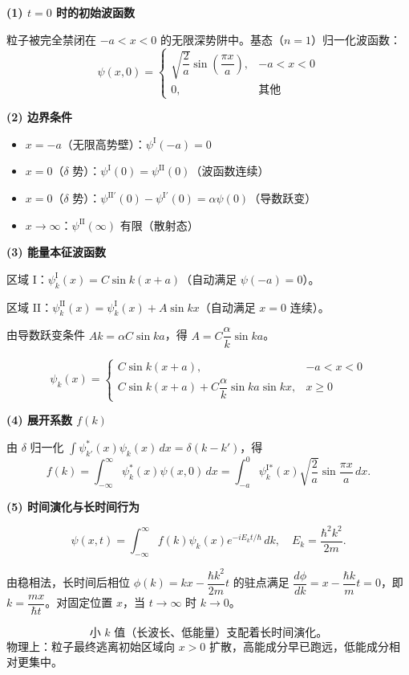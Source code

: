 \begin{derivationbox}[标准解题过程]
\textbf{(1) $t=0$ 时的初始波函数}

粒子被完全禁闭在 $-a<x<0$ 的无限深势阱中。基态（$n=1$）归一化波函数：
\begin{equation}
\boxed{\psi(x,0)=\begin{cases}\sqrt{\dfrac{2}{a}}\sin\left(\dfrac{\pi x}{a}\right),&-a<x<0\\0,&\text{其他}\end{cases}}
\end{equation}

\textbf{(2) 边界条件}

\begin{itemize}
    \item $x=-a$（无限高势壁）：$\psi^{\text{I}}(-a)=0$
    \item $x=0$（$\delta$ 势）：$\psi^{\text{I}}(0)=\psi^{\text{II}}(0)$（波函数连续）
    \item $x=0$（$\delta$ 势）：$\psi^{\text{II}'}(0)-\psi^{\text{I}'}(0)=\alpha\psi(0)$（导数跃变）
    \item $x\to\infty$：$\psi^{\text{II}}(\infty)$ 有限（散射态）
\end{itemize}

\textbf{(3) 能量本征波函数}

区域 I：$\psi_k^{\text{I}}(x)=C\sin k(x+a)$（自动满足 $\psi(-a)=0$）。

区域 II：$\psi_k^{\text{II}}(x)=\psi_k^{\text{I}}(x)+A\sin kx$（自动满足 $x=0$ 连续）。

由导数跃变条件 $Ak=\alpha C\sin ka$，得 $A=C\dfrac{\alpha}{k}\sin ka$。

\begin{equation}
\boxed{\psi_k(x)=\begin{cases}C\sin k(x+a),&-a<x<0\\C\sin k(x+a)+C\dfrac{\alpha}{k}\sin ka\sin kx,&x\geq0\end{cases}}
\end{equation}

\textbf{(4) 展开系数 $f(k)$}

由 $\delta$ 归一化 $\int\psi_{k'}^*(x)\psi_k(x)\,dx=\delta(k-k')$，得
\begin{equation}
\boxed{f(k)=\int_{-\infty}^{\infty}\psi_k^*(x)\psi(x,0)\,dx=\int_{-a}^{0}\psi_k^{\text{I}*}(x)\sqrt{\frac{2}{a}}\sin\frac{\pi x}{a}\,dx.}
\end{equation}

\textbf{(5) 时间演化与长时间行为}

\[
\psi(x,t)=\int_{-\infty}^{\infty}f(k)\psi_k(x)e^{-iE_kt/\hbar}\,dk,\quad E_k=\frac{\hbar^2k^2}{2m}.
\]

由稳相法，长时间后相位 $\phi(k)=kx-\dfrac{\hbar k^2}{2m}t$ 的驻点满足 $\dfrac{d\phi}{dk}=x-\dfrac{\hbar k}{m}t=0$，即 $k=\dfrac{mx}{\hbar t}$。对固定位置 $x$，当 $t\to\infty$ 时 $k\to0$。

\begin{equation}
\boxed{\text{小 }k\text{ 值（长波长、低能量）支配着长时间演化。}}
\end{equation}
物理上：粒子最终逃离初始区域向 $x>0$ 扩散，高能成分早已跑远，低能成分相对更集中。
\end{derivationbox}

